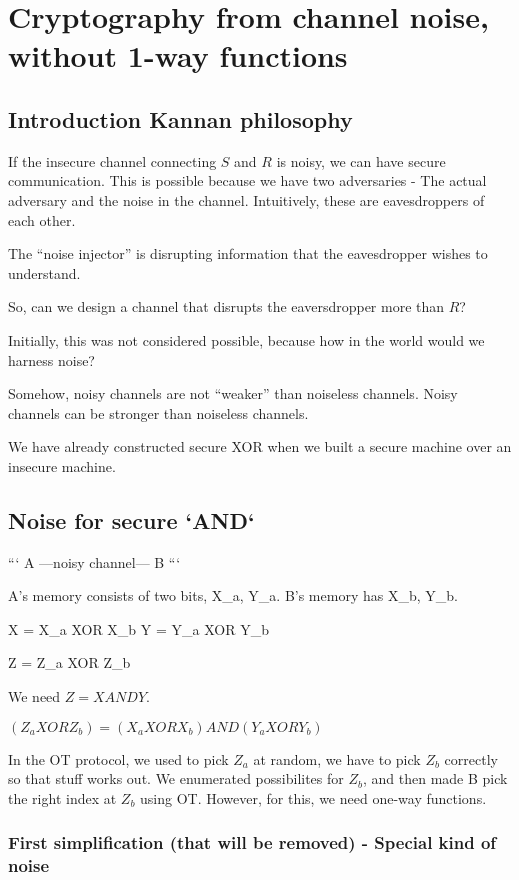 \section{Cryptography from channel noise, without 1-way functions}

\subsection{Introduction Kannan philosophy}
If the insecure channel connecting $S$ and $R$ is noisy, we can have secure communication.
This is possible because we have two adversaries - The actual adversary and the noise
in the channel. Intuitively, these are eavesdroppers of each other.

The ``noise injector'' is disrupting information that the eavesdropper wishes to understand.

So, can we design a channel that disrupts the eaversdropper more than $R$?

Initially, this was not considered possible, because how in the world would we harness noise?

Somehow, noisy channels are not ``weaker'' than noiseless channels. Noisy channels
can be stronger than noiseless channels.


We have already constructed secure XOR when we built a secure machine over an insecure machine.

\subsection{Noise for secure `AND`}


```
A ---noisy channel--- B
```

A's memory consists of two bits, X_a, Y_a. B's memory has X_b, Y_b.

X = X_a XOR X_b
Y = Y_a XOR Y_b

Z = Z_a XOR Z_b

We need $Z = X AND Y$.

$(Z_a XOR Z_b) = (X_a XOR X_b) AND (Y_a XOR Y_b)$

In the OT protocol, we used to pick $Z_a$ at random, we have to pick $Z_b$ correctly so that stuff works out.
We enumerated possibilites for $Z_b$, and then made B pick the right index at $Z_b$ using OT.
However, for this, we need one-way functions.


\subsubsection{First simplification (that will be removed) - Special kind of noise}

